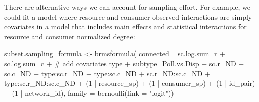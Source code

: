 \documentclass[11pt,]{article}
\newenvironment{Shaded}{}{}
\newcommand{\KeywordTok}[1]{\textcolor[rgb]{0.00,0.00,1.00}{#1}}
\newcommand{\DataTypeTok}[1]{#1}
\newcommand{\DecValTok}[1]{#1}
\newcommand{\StringTok}[1]{\textcolor[rgb]{0.00,0.50,0.50}{#1}}
\newcommand{\CommentTok}[1]{\textcolor[rgb]{0.00,0.50,0.00}{#1}}
\newcommand{\OperatorTok}[1]{#1}
\newcommand{\NormalTok}[1]{#1}
\begin{document}
There are alternative ways we can account for sampling effort. For
example, we could fit a model where resource and consumer observed
interactions are simply covariates in a model that includes main effects
and statistical interactions for resource and consumer normalized
degree:

\begin{Shaded}
\begin{Highlighting}[]
\NormalTok{subset.sampling_formula <-}\StringTok{ }\KeywordTok{brmsformula}\NormalTok{(}
\NormalTok{  connected }\OperatorTok{~}\StringTok{ }\NormalTok{sc.log.sum_r }\OperatorTok{+}\StringTok{ }\NormalTok{sc.log.sum_c }\OperatorTok{+}\StringTok{ }\CommentTok{# add covariates}
\StringTok{    }\NormalTok{type }\OperatorTok{+}\StringTok{ }\NormalTok{subtype_Poll.vs.Disp }\OperatorTok{+}\StringTok{ }\NormalTok{sc.r_ND }\OperatorTok{+}\StringTok{ }\NormalTok{sc.c_ND }\OperatorTok{+}
\StringTok{    }\NormalTok{type}\OperatorTok{:}\NormalTok{sc.r_ND }\OperatorTok{+}\StringTok{ }\NormalTok{type}\OperatorTok{:}\NormalTok{sc.c_ND }\OperatorTok{+}\StringTok{ }\NormalTok{sc.r_ND}\OperatorTok{:}\NormalTok{sc.c_ND }\OperatorTok{+}
\StringTok{    }\NormalTok{type}\OperatorTok{:}\NormalTok{sc.r_ND}\OperatorTok{:}\NormalTok{sc.c_ND }\OperatorTok{+}
\StringTok{    }\NormalTok{(}\DecValTok{1} \OperatorTok{|}\StringTok{ }\NormalTok{resource_sp) }\OperatorTok{+}\StringTok{ }\NormalTok{(}\DecValTok{1} \OperatorTok{|}\StringTok{ }\NormalTok{consumer_sp) }\OperatorTok{+}\StringTok{ }\NormalTok{(}\DecValTok{1} \OperatorTok{|}\StringTok{ }\NormalTok{id_pair) }\OperatorTok{+}\StringTok{ }\NormalTok{(}\DecValTok{1} \OperatorTok{|}\StringTok{ }\NormalTok{network_id),}
  \DataTypeTok{family =} \KeywordTok{bernoulli}\NormalTok{(}\DataTypeTok{link =} \StringTok{"logit"}\NormalTok{))}


\end{Highlighting}
\end{Shaded}
\end{document}
